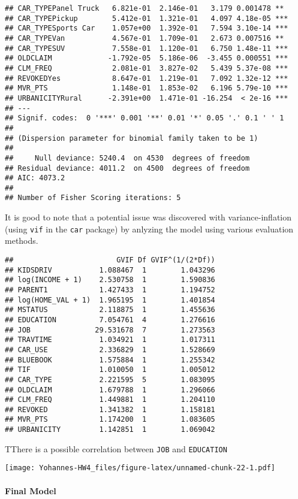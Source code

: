 \documentclass[]{article}
\let\oldparagraph\paragraph
\renewcommand{\paragraph}[1]{\oldparagraph{#1}\mbox{}}
\begin{document}
\begin{verbatim}
## CAR_TYPEPanel Truck   6.821e-01  2.146e-01   3.179 0.001478 ** 
## CAR_TYPEPickup        5.412e-01  1.321e-01   4.097 4.18e-05 ***
## CAR_TYPESports Car    1.057e+00  1.392e-01   7.594 3.10e-14 ***
## CAR_TYPEVan           4.567e-01  1.709e-01   2.673 0.007516 ** 
## CAR_TYPESUV           7.558e-01  1.120e-01   6.750 1.48e-11 ***
## OLDCLAIM             -1.792e-05  5.186e-06  -3.455 0.000551 ***
## CLM_FREQ              2.081e-01  3.827e-02   5.439 5.37e-08 ***
## REVOKEDYes            8.647e-01  1.219e-01   7.092 1.32e-12 ***
## MVR_PTS               1.148e-01  1.853e-02   6.196 5.79e-10 ***
## URBANICITYRural      -2.391e+00  1.471e-01 -16.254  < 2e-16 ***
## ---
## Signif. codes:  0 '***' 0.001 '**' 0.01 '*' 0.05 '.' 0.1 ' ' 1
## 
## (Dispersion parameter for binomial family taken to be 1)
## 
##     Null deviance: 5240.4  on 4530  degrees of freedom
## Residual deviance: 4011.2  on 4500  degrees of freedom
## AIC: 4073.2
## 
## Number of Fisher Scoring iterations: 5
\end{verbatim}

It is good to note that a potential issue was discovered with
variance-inflation (using \texttt{vif} in the \texttt{car} package) by
anlyzing the model using various evaluation methods.

\begin{verbatim}
##                        GVIF Df GVIF^(1/(2*Df))
## KIDSDRIV           1.088467  1        1.043296
## log(INCOME + 1)    2.530758  1        1.590836
## PARENT1            1.427433  1        1.194752
## log(HOME_VAL + 1)  1.965195  1        1.401854
## MSTATUS            2.118875  1        1.455636
## EDUCATION          7.054761  4        1.276616
## JOB               29.531678  7        1.273563
## TRAVTIME           1.034921  1        1.017311
## CAR_USE            2.336829  1        1.528669
## BLUEBOOK           1.575884  1        1.255342
## TIF                1.010050  1        1.005012
## CAR_TYPE           2.221595  5        1.083095
## OLDCLAIM           1.679788  1        1.296066
## CLM_FREQ           1.449881  1        1.204110
## REVOKED            1.341382  1        1.158181
## MVR_PTS            1.174200  1        1.083605
## URBANICITY         1.142851  1        1.069042
\end{verbatim}

TThere is a possible correlation between \texttt{JOB} and
\texttt{EDUCATION}

\texttt{[image: Yohannes-HW4\_files/figure-latex/unnamed-chunk-22-1.pdf]}

\paragraph{Final Model}\label{final-model}
\end{document}

